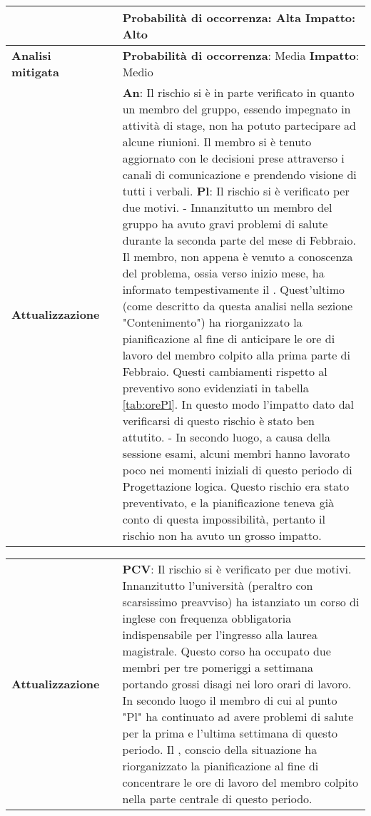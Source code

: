 \begin{table}[H]
\begin{center}
{\begin{tabular}{p{2.5cm}p{0.5cm}p{11cm}}
				& &
				\textbf{Probabilità di occorrenza}: Alta
				\newline
				\textbf{Impatto}: Alto
				\\
				\midrule
				\textbf{Analisi \newline mitigata}
				& &
				\textbf{Probabilità di occorrenza}: Media
				\newline
				\textbf{Impatto}: Medio
				\\
				\midrule
				\textbf{Attualizzazione}
				& &
				\textbf{An}: Il rischio si è in parte verificato in quanto un membro del gruppo, essendo impegnato in attività di stage, non ha potuto partecipare ad alcune riunioni. Il membro si è tenuto aggiornato con le decisioni prese attraverso i canali di comunicazione e prendendo visione di tutti i verbali.
				\newline
				\textbf{Pl}: Il rischio si è verificato per due motivi.
				- Innanzitutto un membro del gruppo ha avuto gravi problemi di salute durante la seconda parte del mese di Febbraio. Il membro, non appena è venuto a conoscenza del problema, ossia verso inizio mese, ha informato tempestivamente il \responsabile. Quest'ultimo (come descritto da questa analisi nella sezione "Contenimento") ha riorganizzato la pianificazione al fine di anticipare le ore di lavoro del membro colpito alla prima parte di Febbraio. Questi cambiamenti 
				rispetto al preventivo sono evidenziati in tabella \ref{tab:orePl}. In questo modo l'impatto dato dal verificarsi di questo rischio è stato ben attutito.
				- In secondo luogo, a causa della sessione esami, alcuni membri hanno lavorato poco nei momenti iniziali di questo periodo di Progettazione logica. Questo rischio era stato preventivato, e la pianificazione teneva già conto di questa impossibilità, pertanto il rischio non ha avuto un grosso impatto.
				\\
				\bottomrule	
			\end{tabular}}
		\end{center}
	\end{table}			
	
	\newpage
	\small
	\begin{table}[H]
		\begin{center}			
			\begin{tabular}{p{2.5cm}p{0.5cm}p{11cm}}
				\arrayrulecolor{lightgray}
				\textbf{Attualizzazione}
				& &
				\textbf{PCV}: Il rischio si è verificato per due motivi. Innanzitutto l'università (peraltro con scarsissimo preavviso) ha istanziato un corso di inglese con frequenza obbligatoria indispensabile per l'ingresso alla laurea magistrale. Questo corso ha occupato due membri per tre pomeriggi a settimana portando grossi disagi nei loro orari di lavoro. In secondo luogo il membro di cui al punto "Pl" ha continuato ad avere problemi di salute per la prima e l'ultima settimana di questo periodo. Il \responsabile, conscio della situazione ha riorganizzato la pianificazione al fine di concentrare le ore di lavoro del membro colpito nella parte centrale di questo periodo.
			\end{tabular}
		\end{center}
	\end{table}
	
